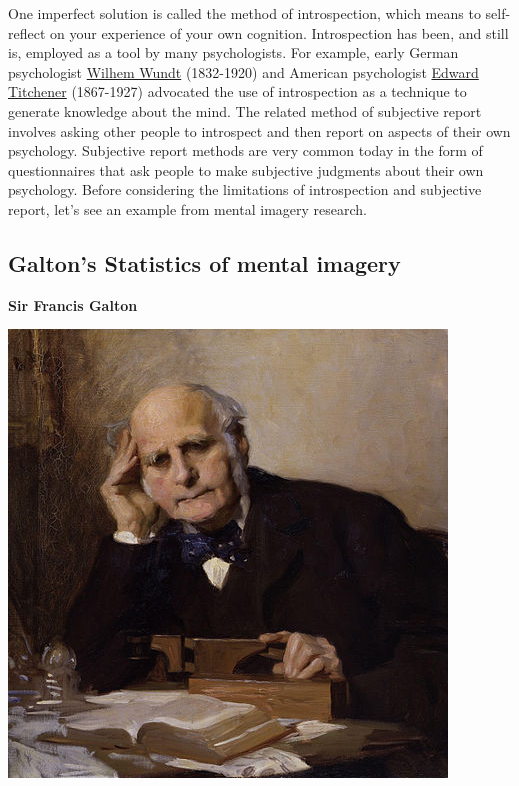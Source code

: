 \documentclass[
  oneside,
  12pt]{crumpbook}
\newenvironment{floatrightbox25}{%
  \wrapfigure{R}{.25\textwidth}%
  }{%
  \endwrapfigure}
\begin{document}
One imperfect solution is called the method of introspection, which means to self-reflect on your experience of your own cognition. Introspection has been, and still is, employed as a tool by many psychologists. For example, early German psychologist \href{https://en.wikipedia.org/wiki/Wilhelm_Wundt}{Wilhem Wundt} (1832-1920) and American psychologist \href{https://en.wikipedia.org/wiki/Edward_B._Titchener}{Edward Titchener} (1867-1927) advocated the use of introspection as a technique to generate knowledge about the mind. The related method of subjective report involves asking other people to introspect and then report on aspects of their own psychology. Subjective report methods are very common today in the form of questionnaires that ask people to make subjective judgments about their own psychology. Before considering the limitations of introspection and subjective report, let's see an example from mental imagery research.

\hypertarget{galtons-statistics-of-mental-imagery}{%
\subsection{Galton's Statistics of mental imagery}\label{galtons-statistics-of-mental-imagery}}

\begin{floatrightbox25}
\textbf{Sir Francis Galton}

\includegraphics[width=1\linewidth]{imgs/Francis_Galton}

\end{floatrightbox25}
\end{document}
